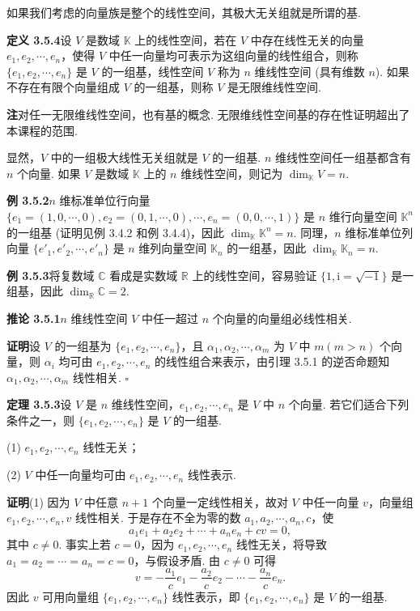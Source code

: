 \documentclass[UTF8,12pt,a4paper,fontset=fandol]{ctexart}
\begin{document}
如果我们考虑的向量族是整个的线性空间，其极大无关组就是所谓的基.

\noindent\textbf{定义 3.5.4}\quad 设 $V$ 是数域 $\mathbb{K}$ 上的线性空间，若在 $V$ 中存在线性无关的向量 $e_1,e_2,\cdots,e_n$，使得 $V$ 中任一向量均可表示为这组向量的线性组合，则称 $\{e_1,e_2,\cdots,e_n\}$ 是 $V$ 的一组基，线性空间 $V$ 称为 $n$ 维线性空间 (具有维数 $n$). 如果不存在有限个向量组成 $V$ 的一组基，则称 $V$ 是无限维线性空间.

\noindent\textbf{注}\quad 对任一无限维线性空间，也有基的概念. 无限维线性空间基的存在性证明超出了本课程的范围.

显然，$V$ 中的一组极大线性无关组就是 $V$ 的一组基. $n$ 维线性空间任一组基都含有 $n$ 个向量. 如果 $V$ 是数域 $\mathbb{K}$ 上的 $n$ 维线性空间，则记为 $\dim_{\mathbb{K}}V=n$.

\noindent\textbf{例 3.5.2}\quad $n$ 维标准单位行向量 $\{e_1=(1,0,\cdots,0),e_2=(0,1,\cdots,0),\cdots,e_n=(0,0,\cdots,1)\}$ 是 $n$ 维行向量空间 $\mathbb{K}^n$ 的一组基 (证明见例 3.4.2 和例 3.4.4)，因此 $\dim_{\mathbb{K}}\mathbb{K}^n=n$. 同理，$n$ 维标准单位列向量 $\{e'_1,e'_2,\cdots,e'_n\}$ 是 $n$ 维列向量空间 $\mathbb{K}_n$ 的一组基，因此 $\dim_{\mathbb{K}}\mathbb{K}_n=n$.

\noindent\textbf{例 3.5.3}\quad 将复数域 $\mathbb{C}$ 看成是实数域 $\mathbb{R}$ 上的线性空间，容易验证 $\{1,\mathrm{i}=\sqrt{-1}\}$ 是一组基，因此 $\dim_{\mathbb{R}}\mathbb{C}=2$.

\noindent\textbf{推论 3.5.1}\quad $n$ 维线性空间 $V$ 中任一超过 $n$ 个向量的向量组必线性相关.

\noindent\textbf{证明}\quad 设 $V$ 的一组基为 $\{e_1,e_2,\cdots,e_n\}$，且 $\alpha_1,\alpha_2,\cdots,\alpha_m$ 为 $V$ 中 $m(m>n)$ 个向量，则 $\alpha_i$ 均可由 $e_1,e_2,\cdots,e_n$ 的线性组合来表示，由引理 3.5.1 的逆否命题知 $\alpha_1,\alpha_2,\cdots,\alpha_m$ 线性相关. $\square$

\noindent\textbf{定理 3.5.3}\quad 设 $V$ 是 $n$ 维线性空间，$e_1,e_2,\cdots,e_n$ 是 $V$ 中 $n$ 个向量. 若它们适合下列条件之一，则 $\{e_1,e_2,\cdots,e_n\}$ 是 $V$ 的一组基.

(1) $e_1,e_2,\cdots,e_n$ 线性无关；

(2) $V$ 中任一向量均可由 $e_1,e_2,\cdots,e_n$ 线性表示.

\noindent\textbf{证明}\quad (1) 因为 $V$ 中任意 $n+1$ 个向量一定线性相关，故对 $V$ 中任一向量 $v$，向量组 $e_1,e_2,\cdots,e_n,v$ 线性相关. 于是存在不全为零的数 $a_1,a_2,\cdots,a_n,c$，使
\[
a_1e_1+a_2e_2+\cdots+a_ne_n+cv=0,
\]
其中 $c\neq 0$. 事实上若 $c=0$，因为 $e_1,e_2,\cdots,e_n$ 线性无关，将导致 $a_1=a_2=\cdots=a_n=c=0$，与假设矛盾. 由 $c\neq 0$ 可得
\[
v=-\frac{a_1}{c}e_1-\frac{a_2}{c}e_2-\cdots-\frac{a_n}{c}e_n.
\]
因此 $v$ 可用向量组 $\{e_1,e_2,\cdots,e_n\}$ 线性表示，即 $\{e_1,e_2,\cdots,e_n\}$ 是 $V$ 的一组基.
\end{document}
